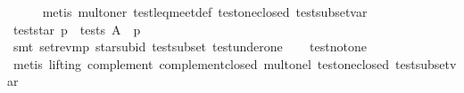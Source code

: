 \begin{isabellebody}
%
\isadelimproof
\ \ \ \ %
\endisadelimproof
%
\isatagproof
{}\isamarkupfalse%
\ {}metis\ mult{}oner\ test{}leq{}meet{}def\ test{}one{}closed\ test{}subset{}var{}%
\endisatagproof
{\isafoldproof}%
%
\isadelimproof
\isanewline
%
\endisadelimproof
\isanewline
\ \ \isamarkupfalse%
\ test{}star{}\ {}p\ {}\ tests\ A\ {}\ p\ {}\ {}{}\isanewline
%
\isadelimproof
\ \ \ \ %
\endisadelimproof
%
\isatagproof
{}\isamarkupfalse%
\ {}smt\ set{}rev{}mp\ star{}subid\ test{}subset\ test{}under{}one{}%
\endisatagproof
{\isafoldproof}%
%
\isadelimproof
\isanewline
%
\endisadelimproof
\isanewline
\ \ \isamarkupfalse%
\ test{}not{}one{}\ {}{}{}\ {}\ {}{}\isanewline
%
\isadelimproof
\ \ \ \ %
\endisadelimproof
%
\isatagproof
{}\isamarkupfalse%
\ {}metis\ {}lifting{}\ complement{}\ complement{}closed\ mult{}onel\ test{}one{}closed\ test{}subset{}var{}%
\endisatagproof
{\isafoldproof}%
%
\isadelimproof
\isanewline

\end{isabellebody}

